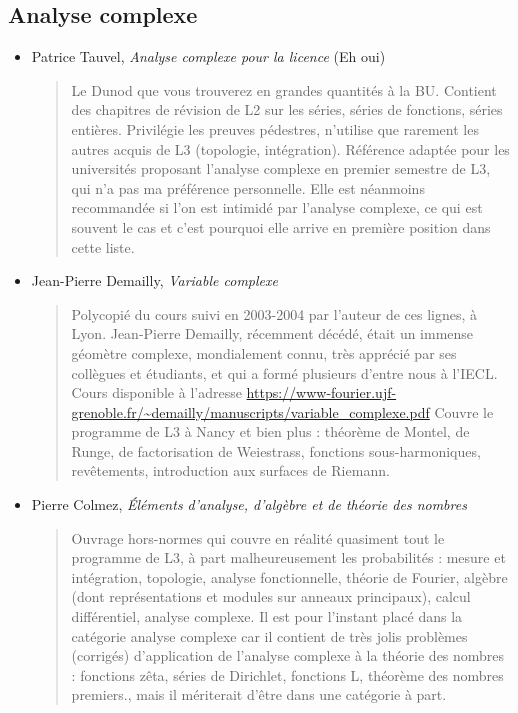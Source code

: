 \documentclass{article}
\begin{document}
\subsection{Analyse complexe}

\begin{mdframed}
\begin{itemize}
\item Patrice Tauvel, \emph{Analyse complexe pour la licence} (Eh oui)
\begin{quote}
Le \og Dunod\fg{} que vous trouverez en grandes quantités à la BU. Contient des chapitres de révision de L2 sur les séries, séries de fonctions, séries entières. Privilégie les preuves pédestres, n'utilise que rarement les autres acquis de L3 (topologie, intégration).  Référence adaptée pour les universités proposant l'analyse complexe en premier semestre de L3, qui n'a pas ma préférence personnelle. Elle est néanmoins recommandée si l'on est intimidé par l'analyse complexe, ce qui est souvent le cas et c'est pourquoi elle arrive en première position dans cette liste.
\end{quote}
\end{itemize}
\end{mdframed}
\begin{itemize}
\item Jean-Pierre Demailly, \emph{Variable complexe}
\begin{quote}
Polycopié du cours suivi en 2003-2004 par l'auteur de ces lignes, à Lyon. Jean-Pierre Demailly, récemment décédé, était un immense géomètre complexe, mondialement connu, très apprécié par ses collègues et étudiants, et qui a formé plusieurs d'entre nous à l'IECL. Cours disponible à l'adresse \url{https://www-fourier.ujf-grenoble.fr/~demailly/manuscripts/variable_complexe.pdf} Couvre le programme de L3 à Nancy et bien plus : théorème de Montel, de Runge, de factorisation de Weiestrass, fonctions sous-harmoniques, revêtements, introduction aux surfaces de Riemann.
\end{quote}
\item Pierre Colmez, \emph{Éléments d'analyse, d'algèbre et de théorie des nombres}
\begin{quote}
Ouvrage hors-normes qui couvre en réalité quasiment tout le programme de L3, à part malheureusement les probabilités : mesure et intégration, topologie, analyse fonctionnelle, théorie de Fourier, algèbre (dont représentations et modules sur anneaux principaux), calcul différentiel, analyse complexe. Il est pour l'instant placé dans la catégorie analyse complexe car il contient de très jolis problèmes (corrigés) d'application de l'analyse complexe à la théorie des nombres : fonctions zêta, séries de Dirichlet, fonctions L, théorème des nombres premiers., mais il mériterait d'être dans une catégorie à part.
\end{quote}
\end{itemize}
\end{document}
